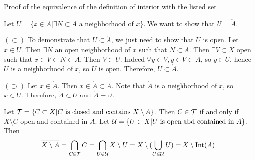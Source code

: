 Proof of the equivalence of the definition of interior with the listed set
\begin{myproof}
	Let $U = \{x\in A| \exists N\subset A\text{ a neighborhood of }x\}$. We want to show that $U=\mathring{A}$.

	$(\subset)$ To demonstrate that $U\subset\mathring{A}$, we just need to show that $U$ is open. Let $x\in U$. Then $\exists N$ an open neighborhood of $x$ such that $N\subset A$. Then $\exists V\subset X$ open such that $x\in V\subset N\subset A$. Then $V\subset U$. Indeed $\forall y\in V, y\in V\subset A$, so $y\in U$, hence $U$ is a neighborhood of $x$, so $U$ is open. Therefore, $U\subset\mathring{A}$.

	$(\supset)$ Let $x\in\mathring{A}$. Then $x\in\mathring{A}\subset A$. Note that $\mathring{A}$ is a neighborhood of $x$, so $x\in U$. Therefore, $\mathring{A}\subset U$ and $\mathring{A} = U$.
\end{myproof}



\begin{myproof}
	Let $\mathcal{T} = \{C\subset X| C \text{ is closed and contains } X\setminus A\}$. Then $C\in\mathcal{T}$ if and only if $X\setminus C$ open and contained in $A$. Let $\mathcal{U} = \{U\subset X| U\text{ is open abd contained in } A\}$. Then 
	$$\overline{X\setminus A} = \bigcap_{C\in\mathcal{T}}C = \bigcap_{U\in\mathcal{U}}X\setminus U = X\setminus(\bigcup_{U\in\mathcal{U}}U) = X\setminus \text{Int}(A)$$
\end{myproof}



